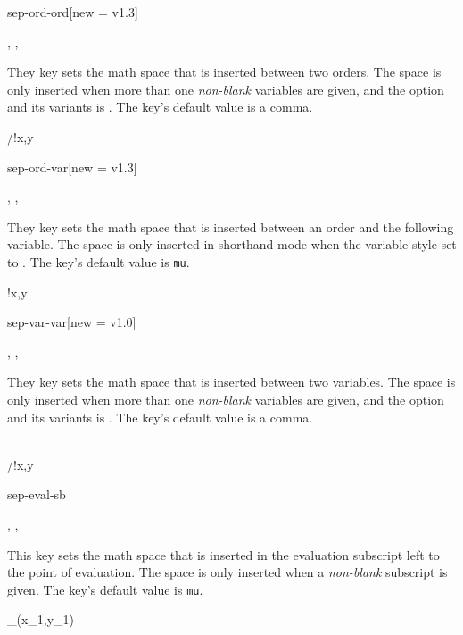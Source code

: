 \begin{option}{sep-ord-ord}[new = v1.3]
	\begin{values}[default = {{,}}]
		, , 
	\end{values}
	They key sets the math space that is inserted between two orders. The space is only inserted when more than one \emph{non-blank} variables are given, and the option  and its variants is . The key's default value is a comma.
	\begin{example}
		/!{x,y}
	\end{example}
\end{option}

\begin{option}{sep-ord-var}[new = v1.3]
	\begin{values}[default = 0]
		, , \marg{delimiter}
	\end{values}
	They key sets the math space that is inserted between an order and the following variable. The space is only inserted in shorthand mode when the variable style set to . The key's default value is  \texttt{mu}.
	\begin{example}
		!{x,y}
	\end{example}
\end{option}

\begin{option}{sep-var-var}[new = v1.0]
	\begin{values}[default = {{,}}]
		, , 
	\end{values}
	They key sets the math space that is inserted between two variables. The space is only inserted when more than one \emph{non-blank} variables are given, and the option  and its variants is . The key's default value is a comma.
	\begin{example}
		\pdv[sep-var-var=\here, style-var=single]{f}{x,y} \\
		/!{x,y}
	\end{example}
\end{option}

\clearpage

\begin{option}{sep-eval-sb}
	\begin{values}[default = 0]
		, , 
	\end{values}
	This key sets the math space that is inserted in the evaluation subscript left to the point of evaluation. The space is only inserted when a \emph{non-blank} subscript is given. The key's default value is  \texttt{mu}.
	\begin{example}
		_{(x_1,y_1)}
	\end{example}
\end{option}

